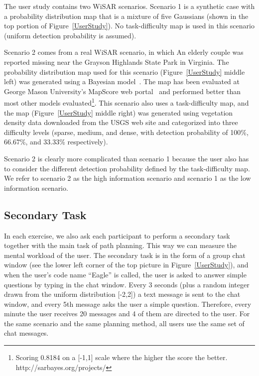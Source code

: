 \documentclass[lettersize, apacite, twoside, HRI]{apa_HRI}
\begin{document}
The user study contains two WiSAR scenarios. Scenario 1 is a synthetic case with a probability distribution map that is a mixture of five Gaussians (shown in the top portion of Figure~\ref{UserStudy}). No task-difficulty map is used in this scenario (uniform detection probability is assumed). 

Scenario 2 comes from a real WiSAR scenario, in which An elderly couple was reported missing near the Grayson Highlands State Park in Virginia. The probability distribution map used for this scenario (Figure~\ref{UserStudy} middle left) was generated using a Bayesian model~\cite{Lin2010Bayesian}. The map has been evaluated at George Mason University's MapScore web portal~\cite{Twardy2012MapScore} and performed better than most other models evaluated\footnote{Scoring 0.8184 on a [-1,1] scale where the higher the score the better. http://sarbayes.org/projects/}. This scenario also uses a task-difficulty map, and the map (Figure~\ref{UserStudy} middle right) was generated using vegetation density data downloaded from the USGS web site and categorized into three difficulty levels (sparse, medium, and dense, with detection probability of 100\%, 66.67\%, and 33.33\% respectively).

Scenario 2 is clearly more complicated than scenario 1 because the user also has to consider the different detection probability defined by the task-difficulty map. We refer to scenario 2 as the high information scenario and scenario 1 as the low information scenario.

\subsection{Secondary Task}

In each exercise, we also ask each participant to perform a secondary task together with the main task of path planning. This way we can measure the mental workload of the user. The secondary task is in the form of a group chat window (see the lower left corner of the top picture in Figure~\ref{UserStudy}), and when the user's code name ``Eagle'' is called, the user is asked to answer simple questions by typing in the chat window. Every 3 seconds (plus a random integer drawn from the uniform distribution [-2,2]) a text message is sent to the chat window, and every 5th message asks the user a simple question. Therefore, every minute the user receives 20 messages and 4 of them are directed to the user. For the same scenario and the same planning method, all users use the same set of chat messages.
\end{document}
